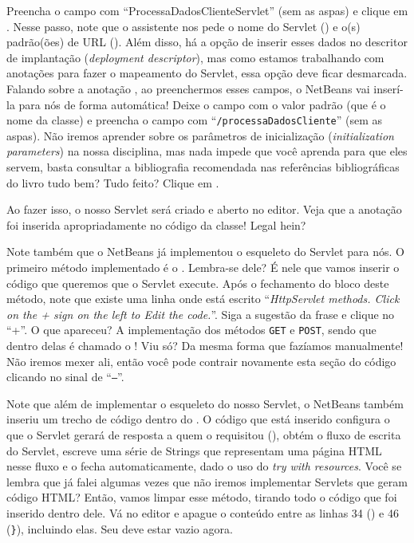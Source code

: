 Preencha o campo  com ``ProcessaDadosClienteServlet'' (sem as aspas) e clique em . Nesse passo, note que o assistente nos pede o nome do Servlet () e o(s) padrão(ões) de URL (). Além disso, há a opção de inserir esses dados no descritor de implantação (\textit{deployment descriptor}), mas como estamos trabalhando com anotações para fazer o mapeamento do Servlet, essa opção deve ficar desmarcada. Falando sobre a anotação , ao preenchermos esses campos, o NetBeans vai inserí-la para nós de forma automática! Deixe o campo  com o valor padrão (que é o nome da classe) e preencha o campo  com ``\texttt{/processaDadosCliente}'' (sem as aspas). Não iremos aprender sobre os parâmetros de inicialização (\textit{initialization parameters}) na nossa disciplina, mas nada impede que você aprenda para que eles servem, basta consultar a bibliografia recomendada nas referências bibliográficas do livro tudo bem? Tudo feito? Clique em .

Ao fazer isso, o nosso Servlet será criado e aberto no editor. Veja que a anotação  foi inserida apropriadamente no código da classe! Legal hein?

Note também que o NetBeans já implementou o esqueleto do Servlet para nós. O primeiro método implementado é o . Lembra-se dele? É nele que vamos inserir o código que queremos que o Servlet execute. Após o fechamento do bloco deste método, note que existe uma linha onde está escrito ``\textit{HttpServlet methods. Click on the + sign on the left to Edit the code.}''. Siga a sugestão da frase e clique no ``+''. O que apareceu? A implementação dos métodos \texttt{GET} e \texttt{POST}, sendo que dentro delas é chamado o ! Viu só? Da mesma forma que fazíamos manualmente! Não iremos mexer ali, então você pode contrair novamente esta seção do código clicando no sinal de ``\texttt{–}''.

Note que além de implementar o esqueleto do nosso Servlet, o NetBeans também inseriu um trecho de código dentro do . O código que está inserido configura o que o Servlet gerará de resposta a quem o requisitou \linebreak(), obtém o fluxo de escrita do Servlet, escreve uma série de Strings que representam uma página HTML nesse fluxo e o fecha automaticamente, dado o uso do \textit{try with resources}. Você se lembra que já falei algumas vezes que não iremos implementar Servlets que geram código HTML? Então, vamos limpar esse método, tirando todo o código que foi inserido dentro dele. Vá no editor e apague o conteúdo entre as linhas 34 () e 46 (\texttt{\}}), incluindo elas. Seu  deve estar vazio agora.


